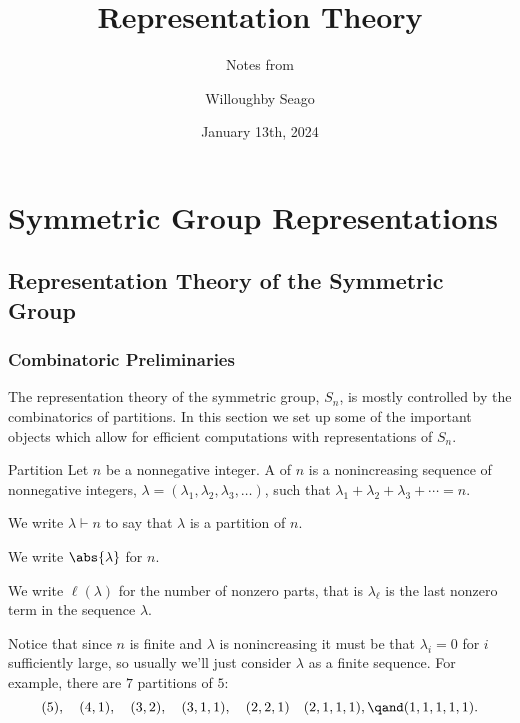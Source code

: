 \documentclass[fleqn]{NotesClass}
\title{Representation Theory}
\author{Willoughby Seago}
\date{January 13th, 2024}
\subtitle{Notes from}
\newcommand{\partition}{\vdash}
\begin{document}
    \frontmatter
    \titlepage
    \innertitlepage{}
    \tableofcontents
    \mainmatter
    
    
    
    \part{Symmetric Group Representations}
    \chapter{Representation Theory of the Symmetric Group}
    \label{chap:reps of Sn}
    \section{Combinatoric Preliminaries}
    The representation theory of the symmetric group, \(S_n\), is mostly controlled by the combinatorics of partitions.
    In this section we set up some of the important objects which allow for efficient computations with representations of \(S_n\).
    
    \begin{dfn}{Partition}{}
        Let \(n\) be a nonnegative integer.
        A  of \(n\) is a nonincreasing sequence of nonnegative integers, \(\lambda = (\lambda_1, \lambda_2, \lambda_3, \dotsc)\), such that \(\lambda_1 + \lambda_2 + \lambda_3 + \dotsb = n\).
    \end{dfn}
    
    \begin{ntn}{}{}
        We write \(\lambda \partition n\) to say that \(\lambda\) is a partition of \(n\).
        
        We write \(\abs{\lambda}\) for \(n\).
        
        We write \(\ell(\lambda)\) for the number of nonzero parts, that is \(\lambda_\ell\) is the last nonzero term in the sequence \(\lambda\).
    \end{ntn}
    
    Notice that since \(n\) is finite and \(\lambda\) is nonincreasing it must be that \(\lambda_i = 0\) for \(i\) sufficiently large, so usually we'll just consider \(\lambda\) as a finite sequence.
    For example, there are \(7\) partitions of \(5\):
    \begin{equation*}
        (5), \quad (4, 1), \quad (3, 2), \quad (3, 1, 1), \quad (2, 2, 1) \quad (2, 1, 1, 1), \qand (1, 1, 1, 1, 1).
    \end{equation*}
    
\end{document}
